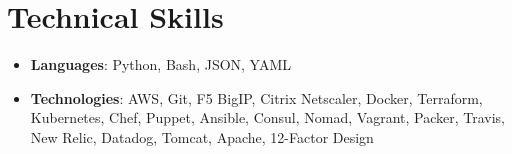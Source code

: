 \documentclass[letterpaper,11pt]{article}
\newcommand{\resumeSubHeadingListStart}{\begin{itemize}[leftmargin=*]}
\newcommand{\resumeSubHeadingListEnd}{\end{itemize}}
\begin{document}
\section{Technical Skills}
  \resumeSubHeadingListStart
    \item{
      \textbf{Languages}{: Python, Bash, JSON, YAML}
    }
      \hfill
    \item{
      \textbf{Technologies}{: AWS, Git, F5 BigIP, Citrix Netscaler, Docker, Terraform, Kubernetes,
        Chef, Puppet, Ansible, Consul, Nomad, Vagrant, Packer, Travis, New Relic, Datadog, Tomcat,
        Apache, 12-Factor Design}
    }
  \resumeSubHeadingListEnd


\end{document}
